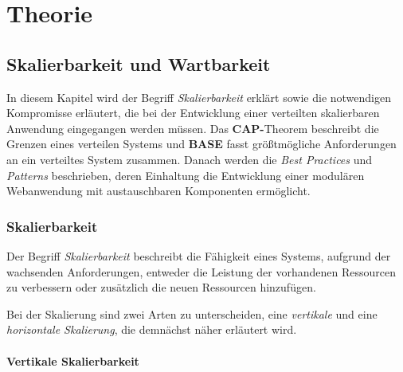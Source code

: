\chapter{Theorie}
\section{Skalierbarkeit und Wartbarkeit}

In diesem Kapitel wird der Begriff \textit{Skalierbarkeit} erklärt sowie die notwendigen Kompromisse erläutert, die bei der Entwicklung einer verteilten skalierbaren Anwendung eingegangen werden müssen. Das \textbf{CAP-}Theorem beschreibt die Grenzen eines verteilen Systems und \textbf{BASE} fasst größtmögliche Anforderungen an ein verteiltes System zusammen. Danach werden die \textit{Best Practices} und \textit{Patterns} beschrieben, deren Einhaltung die Entwicklung einer modulären Webanwendung mit austauschbaren Komponenten ermöglicht. 

\subsection{Skalierbarkeit}\label{scale}
Der Begriff \textit{Skalierbarkeit} \cite{node} beschreibt die Fähigkeit eines Systems, aufgrund der wachsenden Anforderungen, entweder die Leistung der vorhandenen Ressourcen zu verbessern oder zusätzlich die neuen Ressourcen hinzufügen. %

Bei der Skalierung sind zwei Arten zu unterscheiden, eine \textit{vertikale} und eine \textit{horizontale Skalierung}, die demnächst näher erläutert wird.

\subsubsection{Vertikale Skalierbarkeit}

